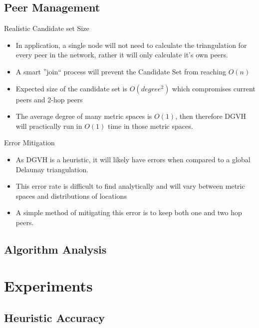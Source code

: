 \documentclass[8pt]{beamer}
\begin{document}
\subsection{Peer Management}
	\begin{frame}{Realistic Candidate set Size}
		\begin{itemize}
			\item In application, a single node will not need to calculate the triangulation for every peer in the network, rather it will only calculate it's own peers.
			\item A smart ''join`` process will prevent the Candidate Set from reaching $O(n)$
			\item Expected size of the candidate set is $O(degree^2)$ which compromises current peers and 2-hop peers
			\item The average degree of many metric spaces is $O(1)$, then therefore DGVH will practically run in $O(1)$ time in those metric spaces.
		\end{itemize}
	\end{frame}
	\begin{frame}{Error Mitigation}
		\begin{itemize}
			\item As DGVH is a heuristic, it will likely have errors when compared to a global Delaunay triangulation.
			\item This error rate is difficult to find analytically and will vary between metric spaces and distributions of locations
			\item A simple method of mitigating this error is to keep both one and two hop peers.
		\end{itemize}
	\end{frame}
	
\subsection{Algorithm Analysis}
	
	
\section{Experiments}
	
\subsection{Heuristic Accuracy}
\end{document}
